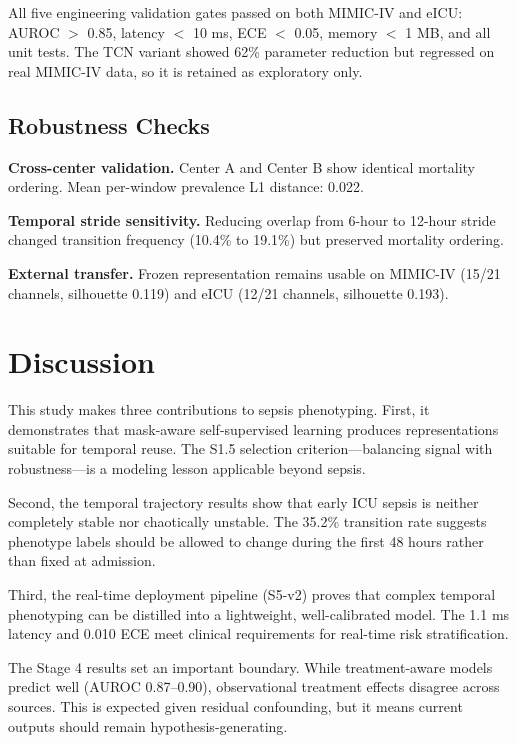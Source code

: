 \documentclass[11pt,a4paper]{article}
\begin{document}
All five engineering validation gates passed on both MIMIC-IV and eICU: AUROC $>$ 0.85, latency $<$ 10 ms, ECE $<$ 0.05, memory $<$ 1 MB, and all unit tests. The TCN variant showed 62\% parameter reduction but regressed on real MIMIC-IV data, so it is retained as exploratory only.

\subsection{Robustness Checks}

\textbf{Cross-center validation.} Center A and Center B show identical mortality ordering. Mean per-window prevalence L1 distance: 0.022.

\textbf{Temporal stride sensitivity.} Reducing overlap from 6-hour to 12-hour stride changed transition frequency (10.4\% to 19.1\%) but preserved mortality ordering.

\textbf{External transfer.} Frozen representation remains usable on MIMIC-IV (15/21 channels, silhouette 0.119) and eICU (12/21 channels, silhouette 0.193).

\FloatBarrier

\section{Discussion}

This study makes three contributions to sepsis phenotyping. First, it demonstrates that mask-aware self-supervised learning produces representations suitable for temporal reuse. The S1.5 selection criterion---balancing signal with robustness---is a modeling lesson applicable beyond sepsis.

Second, the temporal trajectory results show that early ICU sepsis is neither completely stable nor chaotically unstable. The 35.2\% transition rate suggests phenotype labels should be allowed to change during the first 48 hours rather than fixed at admission.

Third, the real-time deployment pipeline (S5-v2) proves that complex temporal phenotyping can be distilled into a lightweight, well-calibrated model. The 1.1 ms latency and 0.010 ECE meet clinical requirements for real-time risk stratification.

The Stage 4 results set an important boundary. While treatment-aware models predict well (AUROC 0.87--0.90), observational treatment effects disagree across sources. This is expected given residual confounding, but it means current outputs should remain hypothesis-generating.
\end{document}
